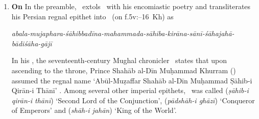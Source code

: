 \begin{enumerate}[topsep=0pt]
\begin{itemize}
    \end{itemize}
    \item \textbf{On \Shahjahan}\quad\label{shahjahan_epithet_siddhantasindhu} In the preamble, \Nityananda\ extols \Shahjahan\ with his encomiastic poetry \parencite[\eg \vid][129]{Minkowskilearnedbrahmin} and transliterates his Persian regnal epithet into \Nagari\ (on f.\thinspace 5v:--16~Kh) as    
    \begin{multicols}{2}
    \columnbreak
    
    \textit{abala-mujaphara-śāhibbadīna-mahammada-sāhiba-kirāna-sānī-śāhajahā-bādiśāha-gājī}
    \end{multicols}
        In his \Padshahnama, the seventeenth-century Mughal chronicler \AbdalHamidLahori\ states that upon ascending to the throne, Prince Shahāb al-Dīn Muḥammad Khurram (\Shahjahan) assumed the regnal name `Abū\Alif l-Muẓaffar Shahāb al-Dīn Muḥammad Ṣāhib-i Qirān-i Thānī' \parencite[6]{Elliot}. Among several other imperial epithets, \Shahjahan\ was called  (\textit{ṣāhib-i qirān-i thānī}) `Second Lord of the Conjunction',  (\textit{pādshāh-i ghāzī}) `Conqueror of Emperors' and  (\textit{shāh-i jahān}) `King of the World'.
        

\end{enumerate}
